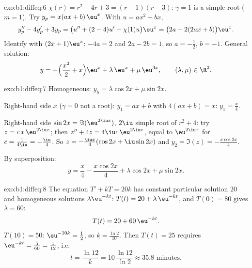 \begin{solution}{exo:b1:diffeq:6}
$\chi(r) = r^2 - 4r + 3 = (r-1)(r-3)$: $\gamma = 1$ is a simple root
($m = 1$). Try $y_p = x(ax + b)\,\eu^x$. With $u = ax^2 + bx$,
\[
y_p'' - 4y_p' + 3y_p = \bigl(u'' + (2 - 4)u' + \chi(1) u\bigr)\eu^x
= \bigl(2a - 2(2ax + b)\bigr)\eu^x .
\]
Identify with $(2x + 1)\eu^x$: $-4a = 2$ and $2a - 2b = 1$, so $a =
-\frac12$, $b = -1$. General solution:
\[
y = -\Bigl(\frac{x^2}{2} + x\Bigr)\eu^{x} + \lambda\,\eu^{x} +
\mu\,\eu^{3x}, \qquad (\lambda, \mu) \in \R^2 .
\]
\end{solution}

\begin{solution}{exo:b1:diffeq:7}
Homogeneous: $y_h = \lambda\cos 2x + \mu\sin 2x$.

Right-hand side $x$ ($\gamma = 0$ not a root): $y_1 = ax + b$ with
$4(ax + b) = x$: $y_1 = \frac x4$.

Right-hand side $\sin 2x = \Im(\eu^{2\iu x})$, $2\iu$ simple root of
$r^2 + 4$: try $z = c\,x\,\eu^{2\iu x}$; then $z'' + 4z =
4\iu c\,\eu^{2\iu x}$, equal to $\eu^{2\iu x}$ for $c =
\frac{1}{4\iu} = -\frac{\iu}{4}$. So $z = -\frac{\iu x}{4}(\cos 2x +
\iu \sin 2x)$ and $y_2 = \Im(z) = -\frac{x\cos 2x}{4}$.

By superposition:
\[
y = \frac{x}{4} - \frac{x\cos 2x}{4} + \lambda\cos 2x + \mu\sin 2x .
\]
\end{solution}

\begin{solution}{exo:b1:diffeq:8}
The equation $T' + kT = 20k$ has constant particular solution $20$ and
homogeneous solutions $\lambda\eu^{-kt}$: $T(t) = 20 +
\lambda\,\eu^{-kt}$, and $T(0) = 80$ gives $\lambda = 60$:
\[
T(t) = 20 + 60\,\eu^{-kt} .
\]
$T(10) = 50$: $\eu^{-10k} = \frac12$, so $k = \frac{\ln 2}{10}$. Then
$T(t) = 25$ requires $\eu^{-kt} = \frac{5}{60} = \frac{1}{12}$, i.e.
\[
t = \frac{\ln 12}{k} = 10\,\frac{\ln 12}{\ln 2} \approx 35.8
\text{ minutes.}
\]
\end{solution}

